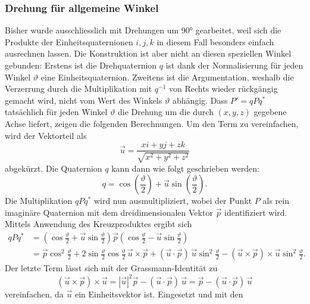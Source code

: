 \subsubsection{Drehung für allgemeine Winkel}

Bisher wurde ausschliesslich mit Drehungen um 90° gearbeitet, weil sich die
Produkte der Einheitsquaternionen $i,j,k$ in diesem Fall besonders einfach
ausrechnen lassen. Die Konstruktion ist aber nicht an diesen speziellen Winkel
gebunden: Erstens ist die Drehquaternion $q$ ist dank der Normalisierung für jeden Winkel 
$\vartheta$ eine Einheitsquaternion. Zweitens ist die Argumentation, weshalb die Verzerrung durch die 
Multiplikation mit $q^{-1}$ von Rechts wieder rückgängig gemacht wird, nicht
vom Wert des Winkels $\vartheta$ abhängig. Dass $P' = qPq^{*}$ tatsächlich 
für jeden Winkel $\vartheta$ die Drehung um die durch $(x,y,z)$ gegebene Achse 
liefert, zeigen die folgenden Berechnungen. Um den Term zu vereinfachen,
wird der Vektorteil als 
\begin{equation*}
    \vec{u} = \frac{xi + yj + zk}{\sqrt{x^2 + y^2 + z^2}}
\end{equation*}
abgekürzt. Die Quaternion $q$ kann dann wie folgt geschrieben werden:
\begin{equation*}
    q = \cos\left(\frac{\vartheta}{2}\right) + \vec{u} \sin\left(\frac{\vartheta}{2}\right).
\end{equation*}
Die Multiplikation $qPq^{*}$ wird nun ausmultipliziert, wobei der Punkt $P$
als rein imaginäre Quaternion mit dem dreidimensionalen Vektor $\vec{p}$ identifiziert wird.
Mittels Anwendung des Kreuzproduktes ergibt sich
\begin{align*}
    qPq^{*}
    &= \left(\cos\frac{\vartheta}{2} + \vec{u}\sin\frac{\vartheta}{2}\right)
    \vec{p}
    \left(\cos\frac{\vartheta}{2} - \vec{u}\sin\frac{\vartheta}{2}\right) \\
    &= \vec{p}\cos^2\frac{\vartheta}{2}
    + 2\sin\frac{\vartheta}{2}\cos\frac{\vartheta}{2}\,\vec{u}\times\vec{p}
    + (\vec{u}\cdot\vec{p})\,\vec{u}\sin^2\frac{\vartheta}{2}
    - (\vec{u}\times\vec{p})\times\vec{u}\sin^2\frac{\vartheta}{2}.
\end{align*}
Der letzte Term lässt sich mit der Grassmann-Identität zu
\begin{equation*}
    (\vec{u}\times\vec{p})\times\vec{u}
    = |\vec{u}|^2\vec{p} - (\vec{u}\cdot\vec{p})\,\vec{u}
    = \vec{p} - (\vec{u}\cdot\vec{p})\,\vec{u}
\end{equation*}
vereinfachen, da $\vec{u}$ ein Einheitsvektor ist. Eingesetzt und mit den
